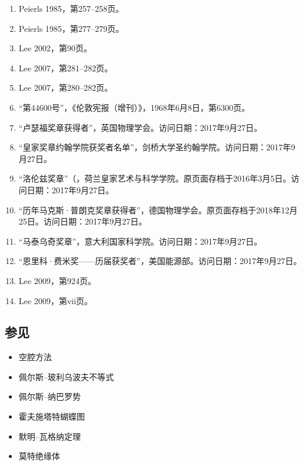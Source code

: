 \begin{enumerate}
\item Peierls 1985，第257–258页。
\item Peierls 1985，第277–279页。
\item Lee 2002，第90页。
\item Lee 2007，第281–282页。
\item Lee 2007，第280–282页。
\item “第44600号”，《伦敦宪报（增刊）》，1968年6月8日，第6300页。
\item “卢瑟福奖章获得者”，英国物理学会。访问日期：2017年9月27日。
\item “皇家奖章约翰学院获奖者名单”，剑桥大学圣约翰学院。访问日期：2017年9月27日。
\item “洛伦兹奖章”（，荷兰皇家艺术与科学学院。原页面存档于2016年3月5日。访问日期：2017年9月27日。
\item “历年马克斯·普朗克奖章获得者”，德国物理学会。原页面存档于2018年12月25日。访问日期：2017年9月27日。
\item “马泰乌奇奖章”，意大利国家科学院。访问日期：2017年9月27日。
\item “恩里科·费米奖——历届获奖者”，美国能源部。访问日期：2017年9月27日。
\item Lee 2009，第924页。
\item Lee 2009，第vii页。
\end{enumerate}
\subsection{参见}
\begin{itemize}
\item 空腔方法
\item 佩尔斯–玻利乌波夫不等式
\item 佩尔斯–纳巴罗势
\item 霍夫施塔特蝴蝶图
\item 默明–瓦格纳定理
\item 莫特绝缘体
\end{itemize}
